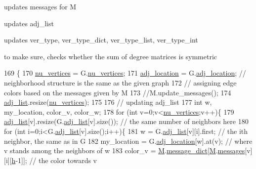 \begin{DoxyItemize}
\item updates messages for M
\item updates adj\+\_\+list
\item updates ver\+\_\+type, ver\+\_\+type\+\_\+dict, ver\+\_\+type\+\_\+list, ver\+\_\+type\+\_\+int
\item to make sure, checks whether the sum of degree matrices is symmetric 
\end{DoxyItemize}
\begin{DoxyCode}
169 \{
170   \hyperlink{classcolored__graph_a90ece8eb1fec52f3f41549ab527c1d5b}{nu\_vertices} = G.\hyperlink{classmarked__graph_acf79c6aeb8f32614cb14a5baaa6c9f9b}{nu\_vertices};
171   \hyperlink{classcolored__graph_ad657e7e86bee874d19dbc1765e1edaa7}{adj\_location} = G.\hyperlink{classmarked__graph_a3ae722ea9583ad23af34d789a88ac01a}{adj\_location}; \textcolor{comment}{// neighborhood structure is the same as the given
       graph}
172   \textcolor{comment}{// assigning edge colors based on the messages given by M}
173   \textcolor{comment}{//M.update\_messages();}
174   \hyperlink{classcolored__graph_a45dce16965079286cf3f41a54a1b2ea4}{adj\_list}.resize(\hyperlink{classcolored__graph_a90ece8eb1fec52f3f41549ab527c1d5b}{nu\_vertices});
175 
176   \textcolor{comment}{// updating adj\_list}
177   \textcolor{keywordtype}{int} w, my\_location, color\_v, color\_w;
178   \textcolor{keywordflow}{for} (\textcolor{keywordtype}{int} v=0;v<\hyperlink{classcolored__graph_a90ece8eb1fec52f3f41549ab527c1d5b}{nu\_vertices};v++)\{
179     \hyperlink{classcolored__graph_a45dce16965079286cf3f41a54a1b2ea4}{adj\_list}[v].resize(G.\hyperlink{classmarked__graph_a1a0bf7ca413a278763f7c878b3b6fd6f}{adj\_list}[v].size()); \textcolor{comment}{// the same number of neighbors here}
180     \textcolor{keywordflow}{for} (\textcolor{keywordtype}{int} i=0;i<G.\hyperlink{classmarked__graph_a1a0bf7ca413a278763f7c878b3b6fd6f}{adj\_list}[v].size();i++)\{
181       w = G.\hyperlink{classmarked__graph_a1a0bf7ca413a278763f7c878b3b6fd6f}{adj\_list}[v][i].first; \textcolor{comment}{// the ith neighbor, the same as in G}
182       my\_location = G.\hyperlink{classmarked__graph_a3ae722ea9583ad23af34d789a88ac01a}{adj\_location}[w].at(v); \textcolor{comment}{// where v stands among the neighbors of w}
183       color\_v = \hyperlink{classcolored__graph_ab72c568fe12f7c849ca6bffb145aec47}{M}.\hyperlink{classgraph__message_a7890d2dff06b9de6f98734c69d8fbcfd}{message\_dict}[\hyperlink{classcolored__graph_ab72c568fe12f7c849ca6bffb145aec47}{M}.\hyperlink{classgraph__message_a06a1d1ab91b4891c65ea80205566f800}{messages}[v][i][\hyperlink{classcolored__graph_ae27062a4ee59df2670d3a0c81e85a3fa}{h}-1]]; \textcolor{comment}{// the color towards v
}
\end{DoxyCode}
